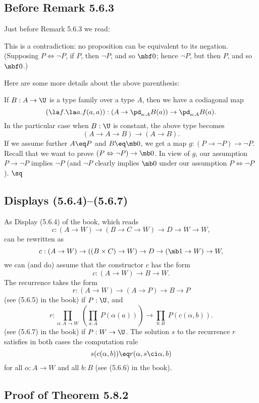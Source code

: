 \documentclass[12pt]{article}
\begin{document}

\subsection{Before Remark 5.6.3}%

Just before Remark 5.6.3 we read:

\nn\guillemotleft This is a contradiction: no proposition can be equivalent to its negation. (Supposing $P\Leftrightarrow\neg P$, if $P$, then $\neg P$, and so $\mbf0$; hence $\neg P$, but then $P$, and so $\mbf0$.)\guillemotright

Here are some more details about the above parenthesis:

If $B:A\to\U$ is a type family over a type $A$, then we have a codiagonal map 
\begin{equation}\label{563}
(\la f.\la a.f(a,a)):\left(A\to\pd_{a:A}B(a)\right)\to\pd_{a:A}B(a).
\end{equation} 
In the particular case when $B:\U$ is constant, the above type becomes 
$$
(A\to A\to B)\to(A\to B).
$$ 
If we assume further $A\eq P$ and $B\eq\mb0$, we get a map $g:(P\to\neg P)\to\neg P$. Recall that we want to prove $(P\Leftrightarrow\neg P)\to\mb0$. In view of $g$, our assumption $P\to\neg P$ implies $\neg P$ (and $\neg P$ clearly implies $\mb0$ under our assumption $P\Leftrightarrow\neg P$). $\sq$


\subsection{Displays (5.6.4)--(5.6.7)}%

As Display (5.6.4) of the book, which reads 
$$
c:(A\to W)\to(B\to C\to W)\to D\to W\to W,
$$ 
can be rewritten as 
$$
c:(A\to W)\to((B\times C)\to W)\to D\to(\mb1\to W)\to W,
$$ 
we can (and do) assume that the constructor $c$ has the form 
$$
c:(A\to W)\to B\to W.
$$ 
The recurrence takes the form 
$$
r:(A\to W)\to(A\to P)\to B\to P
$$ 
(see (5.6.5) in the book) if $P:\U$, and 
$$
r:\prod_{\alpha:A\to W}\ \left(\prod_{a:A}\ P(\alpha(a))\right)\to\prod_{b:B}\ P(c(\alpha,b)).
$$ 
(see (5.6.7) in the book) if $P:W\to\U$. The solution $s$ to the recurrence $r$ satisfies in both cases the computation rule
$$
s(c(\alpha,b))\eq r(\alpha,s\ci\alpha,b)
$$ 
for all $\alpha:A\to W$ and all $b:B$ (see (5.6.6) in the book).


\subsection{Proof of Theorem 5.8.2}\label{582}
\end{document}
